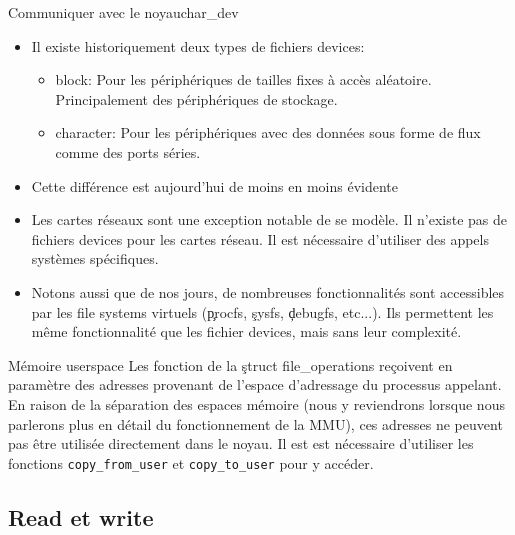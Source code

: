 \begin{frame}[fragile=singleslide]{Communiquer avec le noyau}{char\_dev}
  \begin{itemize} 
  \item Il existe historiquement deux types de fichiers devices:
    \begin{itemize}
    \item  block: Pour  les  périphériques de  tailles  fixes à  accès
      aléatoire. Principalement des périphériques de stockage.
    \item  character: Pour  les  périphériques avec  des données  sous
      forme de flux comme des ports séries.
    \end{itemize} 
  \item Cette différence est aujourd'hui de moins en moins évidente
  \item Les cartes réseaux sont une exception notable de se modèle. Il
    n'existe pas de  fichiers devices pour les cartes  réseau.  Il est
    nécessaire d'utiliser des appels systèmes spécifiques.
  \item Notons  aussi que de nos jours,  de nombreuses fonctionnalités
    sont  accessibles  par  les  file  systems  virtuels  (\c{procfs},
    \c{sysfs},   \c{debugfs},  etc...).   Ils   permettent  les   même
    fonctionnalité que les fichier devices, mais sans leur complexité.
  \end{itemize} 
\end{frame}

\begin{frame}[fragile=singleslide]{Mémoire userspace}
  Les fonction de la \c{struct file_operations} reçoivent en paramètre
  des  adresses  provenant   de  l'espace  d'adressage  du  processus
  appelant. En  raison de la  séparation des espaces mémoire  (nous y
  reviendrons lorsque  nous parlerons plus en  détail du fonctionnement
  de la MMU), ces adresses  ne peuvent pas être utilisée directement
  dans  le  noyau. Il  est  est  nécessaire  d'utiliser les  fonctions
  \verb+copy_from_user+ et \verb+copy_to_user+ pour y accéder.
\end{frame}
  
\subsection{Read et write}

